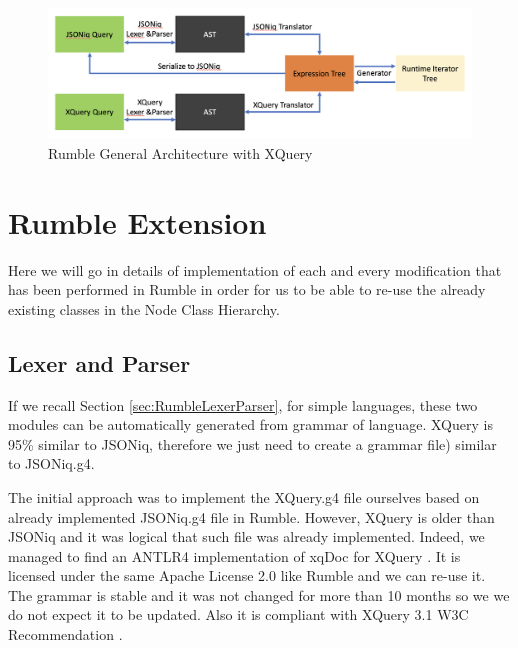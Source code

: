 \begin{figure}[h!]
	\includegraphics[width=\linewidth]{double_parsing_architecture.png}
	\vspace*{-5mm}
	\caption{Rumble General Architecture with XQuery}
	\label{fig:Rumble_General_Architecture_With_XQuery}
\end{figure}

\section{Rumble Extension}
Here we will go in details of implementation of each and every modification that has been performed in Rumble in order for us to be able to re-use the already existing classes in the Node Class Hierarchy. 

\subsection{Lexer and Parser}
If we recall Section \ref{sec:RumbleLexerParser}, for simple languages, these two modules can be automatically generated from grammar of language. XQuery is 95\% similar to JSONiq, therefore we just need to create a grammar file) similar to JSONiq.g4. 

The initial approach was to implement the XQuery.g4 file ourselves based on already implemented JSONiq.g4 file in Rumble. However, XQuery is older than JSONiq and it was logical that such file was already implemented. Indeed, we managed to find an ANTLR4 implementation of xqDoc for XQuery \cite{XqueryGrammar}. It is licensed under the same Apache License 2.0 like Rumble and we can re-use it. The grammar is stable and it was not changed for more than 10 months so we we do not expect it to be updated. Also it is compliant with XQuery 3.1 W3C Recommendation \cite{XQueryRecommendation}. 

